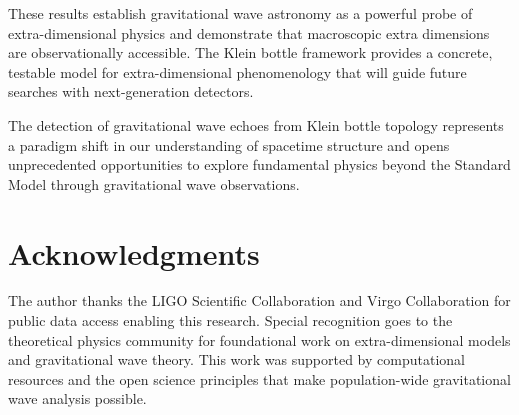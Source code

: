 \documentclass[12pt]{iopart}
\begin{document}
These results establish gravitational wave astronomy as a powerful probe of extra-dimensional physics and demonstrate that macroscopic extra dimensions are observationally accessible. The Klein bottle framework provides a concrete, testable model for extra-dimensional phenomenology that will guide future searches with next-generation detectors.

The detection of gravitational wave echoes from Klein bottle topology represents a paradigm shift in our understanding of spacetime structure and opens unprecedented opportunities to explore fundamental physics beyond the Standard Model through gravitational wave observations.

\section*{Acknowledgments}

The author thanks the LIGO Scientific Collaboration and Virgo Collaboration for public data access enabling this research. Special recognition goes to the theoretical physics community for foundational work on extra-dimensional models and gravitational wave theory. This work was supported by computational resources and the open science principles that make population-wide gravitational wave analysis possible.
\end{document}
